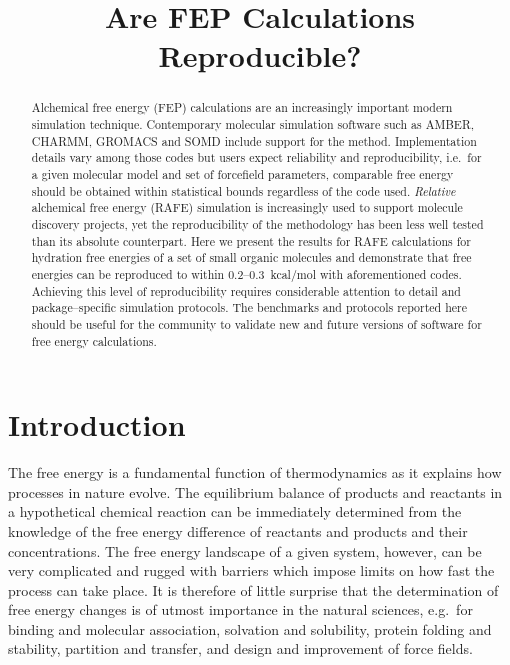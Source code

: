 \documentclass[journal=jctcce,manuscript=article]{achemso}
\title{Are FEP Calculations Reproducible?}
\begin{document}
\begin{abstract}
  Alchemical free energy (FEP) calculations are an increasingly
  important modern simulation technique.  Contemporary molecular
  simulation software such as AMBER, CHARMM, GROMACS and SOMD include
  support for the method.  Implementation details vary among those
  codes but users expect reliability and reproducibility, i.e.\ for a
  given molecular model and set of forcefield parameters, comparable
  free energy should be obtained within statistical bounds regardless
  of the code used.  \emph{Relative} alchemical free energy (RAFE)
  simulation is increasingly used to support molecule discovery
  projects, yet the reproducibility of the methodology has been less
  well tested than its absolute counterpart.  Here we present the
  results for RAFE calculations for hydration free energies of a set
  of small organic molecules and demonstrate that free energies can be
  reproduced to within 0.2--\SI{0.3}{kcal/mol} with aforementioned
  codes.  Achieving this level of reproducibility requires considerable
  attention to detail and package--specific simulation protocols. The
  benchmarks and protocols reported here should be useful for the
  community to validate new and future versions of software for free
  energy calculations.
\end{abstract}

\begin{tocentry}
\end{tocentry}

\section{Introduction}
\label{sec:intro}

The free energy is a fundamental function of thermodynamics as it explains
how processes in nature evolve.  The equilibrium balance of products and reactants in a hypothetical chemical reaction can be immediately determined
from the knowledge of the free energy difference of reactants and
products and their concentrations.  The free energy landscape of a given
system, however, can be very complicated and rugged with barriers which impose
limits on how fast the process can take place.  It is therefore of
little surprise that the determination of free energy changes is of
utmost importance in the natural sciences, e.g.\ for binding and
molecular association, solvation and solubility, protein folding and
stability, partition and transfer, and design and improvement of force
fields.
\end{document}
